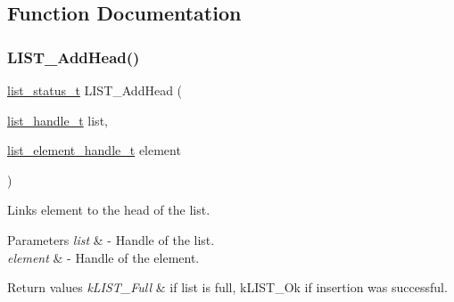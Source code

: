 \subsection{Function Documentation}
\mbox{\label{group___generic_list_ga4c491e8a89ae3322086cb414242c7f3f}} 
\subsubsection{\texorpdfstring{LIST\_AddHead()}{LIST\_AddHead()}}
{\footnotesize\ttfamily \mbox{\hyperlink{group___generic_list_gaae3dc4a15b24287b8c3ac8706195aa7e}{list\+\_\+status\+\_\+t}} L\+I\+S\+T\+\_\+\+Add\+Head (\begin{DoxyParamCaption}\item[{\mbox{\hyperlink{structlist__label}{list\+\_\+handle\+\_\+t}}}]{list,  }\item[{\mbox{\hyperlink{structlist__element__tag}{list\+\_\+element\+\_\+handle\+\_\+t}}}]{element }\end{DoxyParamCaption})}



Links element to the head of the list. 


\begin{DoxyParams}{Parameters}
{\em list} & -\/ Handle of the list. \\
\hline
{\em element} & -\/ Handle of the element. \\
\hline
\end{DoxyParams}

\begin{DoxyRetVals}{Return values}
{\em k\+L\+I\+S\+T\+\_\+\+Full} & if list is full, k\+L\+I\+S\+T\+\_\+\+Ok if insertion was successful.\\
\hline
\end{DoxyRetVals}


